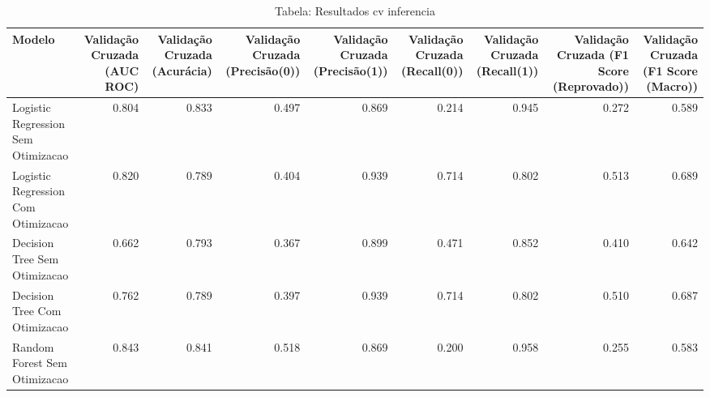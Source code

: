 \begin{table}[H] %
    \centering
    \caption{Tabela: Resultados cv inferencia}
    \label{tab:resultados_cv_inferencia}
    \renewcommand{\arraystretch}{1.25} %
    \begin{adjustwidth}{ -1in }{ -1in } %
    \centering %
    \small %
    \begin{tabular}{lrrrrrrrr}
\toprule
                            Modelo &  Validação Cruzada (AUC ROC) &  Validação Cruzada (Acurácia) &  Validação Cruzada (Precisão(0)) &  Validação Cruzada (Precisão(1)) &  Validação Cruzada (Recall(0)) &  Validação Cruzada (Recall(1)) &  Validação Cruzada (F1 Score (Reprovado)) &  Validação Cruzada (F1 Score (Macro)) \\
\midrule
Logistic Regression Sem Otimizacao &                        0.804 &                         0.833 &                            0.497 &                            0.869 &                          0.214 &                          0.945 &                                     0.272 &                                 0.589 \\
Logistic Regression Com Otimizacao &                        0.820 &                         0.789 &                            0.404 &                            0.939 &                          0.714 &                          0.802 &                                     0.513 &                                 0.689 \\
      Decision Tree Sem Otimizacao &                        0.662 &                         0.793 &                            0.367 &                            0.899 &                          0.471 &                          0.852 &                                     0.410 &                                 0.642 \\
      Decision Tree Com Otimizacao &                        0.762 &                         0.789 &                            0.397 &                            0.939 &                          0.714 &                          0.802 &                                     0.510 &                                 0.687 \\
      Random Forest Sem Otimizacao &                        0.843 &                         0.841 &                            0.518 &                            0.869 &                          0.200 &                          0.958 &                                     0.255 &                                 0.583 \\

\end{tabular}
\end{adjustwidth}
\end{table}
